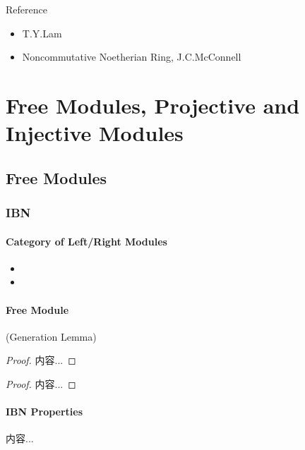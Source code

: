 \documentclass[Total.tex]{subfiles}
\begin{document}
	
	Reference
	\begin{itemize}
		\item T.Y.Lam
		\item Noncommutative Noetherian Ring, J.C.McConnell
	\end{itemize}
	\chapter{Free Modules, Projective and Injective Modules}
		\section{Free Modules}
			\subsection{IBN}
				\subsubsection{Category of Left/Right Modules}
				
					\begin{Def}
						\begin{itemize}
							\item 
							\item 
						\end{itemize}
					\end{Def}
				\subsubsection{Free Module}
				
					\begin{lemma}
						(Generation Lemma)
					\end{lemma}
					\begin{proof}
						内容...
					\end{proof}
					
					\begin{corollary}
						
					\end{corollary}
					\begin{proof}
						内容...
					\end{proof}
				\subsubsection{IBN Properties}
				
					\begin{Def}
						内容...
					\end{Def}
\end{document}
